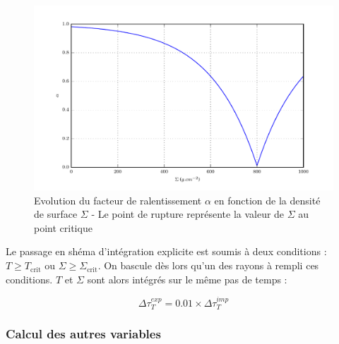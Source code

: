\begin{figure}
  \includegraphics{figures/alpha_fonction_de_sigma.pdf}
  \caption{Evolution du facteur de ralentissement $\alpha$ en fonction de la densité de surface $\Sigma$ - Le point de rupture représente la valeur de $\Sigma$ au point critique}
  \label{fig::alpha_fct_sig}
\end{figure}

Le passage en shéma d'intégration explicite est soumis à deux conditions : $T
\ge T_\textrm{crit}$ ou $\Sigma \ge \Sigma_\textrm{crit}$. On bascule dès lors
qu'un des rayons à rempli ces conditions. $T$ et $\Sigma$ sont alors intégrés
sur le même pas de temps :

\begin{equation}
\Delta \tau_{T}^{exp} = 0.01 \times \Delta \tau_{T}^{imp}
\end{equation}

\subsubsection{Calcul des autres variables}

